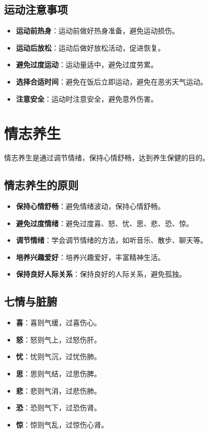 \documentclass[12pt,UTF8]{ctexbook}
\begin{document}
\subsection{运动注意事项}

\begin{itemize}
\item \textbf{运动前热身}：运动前做好热身准备，避免运动损伤。
\item \textbf{运动后放松}：运动后做好放松活动，促进恢复。
\item \textbf{避免过度运动}：运动量适中，避免过度劳累。
\item \textbf{选择合适时间}：避免在饭后立即运动，避免在恶劣天气运动。
\item \textbf{注意安全}：运动时注意安全，避免意外伤害。
\end{itemize}

\section{情志养生}

情志养生是通过调节情绪，保持心情舒畅，达到养生保健的目的。

\subsection{情志养生的原则}

\begin{itemize}
\item \textbf{保持心情舒畅}：避免情绪波动，保持心情舒畅。
\item \textbf{避免过度情绪}：避免过度喜、怒、忧、思、悲、恐、惊。
\item \textbf{调节情绪}：学会调节情绪的方法，如听音乐、散步、聊天等。
\item \textbf{培养兴趣爱好}：培养兴趣爱好，丰富精神生活。
\item \textbf{保持良好人际关系}：保持良好的人际关系，避免孤独。
\end{itemize}

\subsection{七情与脏腑}

\begin{itemize}
\item \textbf{喜}：喜则气缓，过喜伤心。
\item \textbf{怒}：怒则气上，过怒伤肝。
\item \textbf{忧}：忧则气沉，过忧伤肺。
\item \textbf{思}：思则气结，过思伤脾。
\item \textbf{悲}：悲则气消，过悲伤肺。
\item \textbf{恐}：恐则气下，过恐伤肾。
\item \textbf{惊}：惊则气乱，过惊伤心肾。
\end{itemize}
\end{document}
